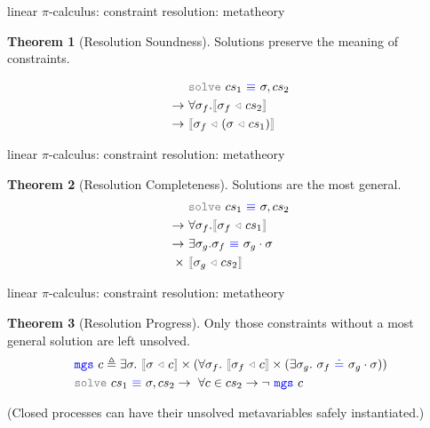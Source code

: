 \documentclass[dvipsnames]{beamer}
\theoremstyle{definition}\newtheorem{mytheorem}{Theorem}[section]
\newcommand{\picalc}{$\pi$-calculus}
\newcommand{\func}[1]{\textcolor{gray}{\mathtt{#1}}}
\newcommand{\type}[1]{\textcolor{blue}{\mathtt{#1}}}
\newcommand{\tEq}[2]{#1~\type{\equiv}~#2}
\newcommand{\subst}[2]{#1 ~ \func{\triangleleft} ~ #2}
\newcommand{\interpr}[1]{\func{[\![} #1 \func{]\!]}}
\begin{document}
\begin{frame}{linear \picalc{}: constraint resolution: metatheory}
\begin{mytheorem}[Resolution Soundness]\label{resolution-soundness}
Solutions preserve the meaning of constraints.
\end{mytheorem}
\[
\begin{aligned}[c]
& \func{solve}~cs_1 \tEq{} \sigma , cs_2 \\
\to ~ & \forall \sigma_f . \interpr{\subst{\sigma_f}{cs_2}} \\
\to ~ & \interpr{\subst{\sigma_f}{(\subst{\sigma}{cs_1})}}
\end{aligned}
\]
\end{frame}

\begin{frame}{linear \picalc{}: constraint resolution: metatheory}
\begin{mytheorem}[Resolution Completeness]\label{resolution-completeness}
Solutions are the most general.
\[
\begin{aligned}[c]
& \func{solve}~cs_1 \tEq{} \sigma , cs_2 \\
\to ~ & \forall \sigma_f . \interpr{\subst{\sigma_f}{cs_1}} \\
\to ~ & \exists \sigma_g . \sigma_f \tEq{} \sigma_g \cdot \sigma \\
\times ~ & \interpr{\subst{\sigma_g}{cs_2}}
\end{aligned}
\]
\end{mytheorem}
\end{frame}

\begin{frame}{linear \picalc{}: constraint resolution: metatheory}
\begin{mytheorem}[Resolution Progress]\label{resolution-progress}
Only those constraints without a most general solution are left unsolved.
\[
\begin{aligned}[c]
& \type{mgs} ~ c \triangleq \exists \sigma. ~ \interpr{\subst{\sigma}{c}} \times (\forall \sigma_f . ~ \interpr{\subst{\sigma_f}{c}} \times (\exists \sigma_g. ~ \sigma_f ~ \type{\doteq} ~ \sigma_g \cdot \sigma)) \\
& \func{solve}~cs_1 \tEq{} \sigma , cs_2 \to ~ \forall c \in cs_2 \to \neg ~ \type{mgs} ~ c
\end{aligned}
\]
\end{mytheorem}

(Closed processes can have their unsolved metavariables safely instantiated.)
\end{frame}
\end{document}
